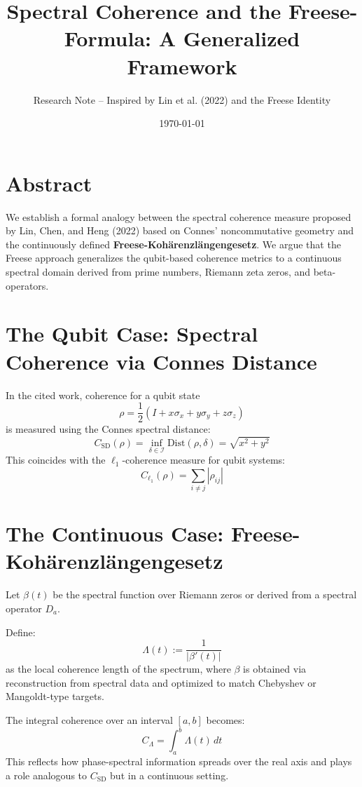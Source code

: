 \documentclass[11pt]{article}
\title{Spectral Coherence and the Freese-Formula: A Generalized Framework}
\author{Research Note – Inspired by Lin et al. (2022) and the Freese Identity}
\date{\today}
\begin{document}
\maketitle

\section*{Abstract}
We establish a formal analogy between the spectral coherence measure proposed by Lin, Chen, and Heng (2022) based on Connes' noncommutative geometry and the continuously defined \textbf{Freese-Kohärenzlängengesetz}. We argue that the Freese approach generalizes the qubit-based coherence metrics to a continuous spectral domain derived from prime numbers, Riemann zeta zeros, and beta-operators.

\section{The Qubit Case: Spectral Coherence via Connes Distance}
In the cited work, coherence for a qubit state 
\[
\rho = \frac{1}{2} \left( I + x\sigma_x + y\sigma_y + z\sigma_z \right)
\]
is measured using the Connes spectral distance:
\[
C_{\text{SD}}(\rho) = \inf_{\delta \in \mathcal{I}} \text{Dist}(\rho, \delta) = \sqrt{x^2 + y^2}
\]
This coincides with the $\ell_1$-coherence measure for qubit systems:
\[
C_{\ell_1}(\rho) = \sum_{i\neq j} |\rho_{ij}|
\]

\section{The Continuous Case: Freese-Kohärenzlängengesetz}
Let $\beta(t)$ be the spectral function over Riemann zeros or derived from a spectral operator $D_a$.

Define:
\[
\Lambda(t) := \frac{1}{|\beta'(t)|}
\]
as the local coherence length of the spectrum, where $\beta$ is obtained via reconstruction from spectral data and optimized to match Chebyshev or Mangoldt-type targets.

The integral coherence over an interval $[a,b]$ becomes:
\[
C_{\Lambda} = \int_a^b \Lambda(t) \, dt
\]
This reflects how phase-spectral information spreads over the real axis and plays a role analogous to $C_{\text{SD}}$ but in a continuous setting.
\end{document}
